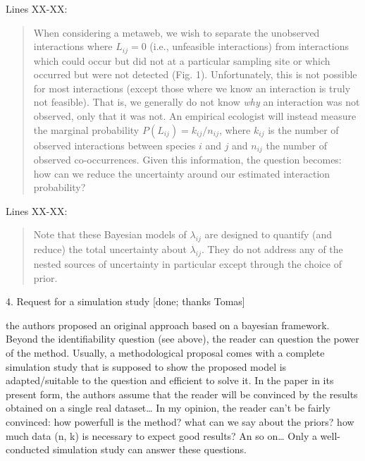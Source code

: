 \documentclass[12pt]{letter}
\newenvironment{refquote}{\bigskip \begin{it}}{\end{it}\smallskip}
\begin{document}
		Lines XX-XX:


		\begin{quotation}
			When considering a metaweb, we wish to separate the unobserved interactions where $L_{ij} = 0$ (i.e., unfeasible interactions) from interactions which could occur but did not at a particular sampling site or which occurred but were not detected (Fig. 1). Unfortunately, this is not possible for most interactions (except those where we know an interaction is truly not feasible). That is, we generally do not know \emph{why} an interaction was not observed, only that it was not. An empirical ecologist will instead measure the marginal probability $P(L_{ij}) = k_{ij}/n_{ij}$, where $k_{ij}$ is the number of observed interactions between species $i$ and $j$ and $n_{ij}$ the number of observed co-occurrences. Given this information, the question becomes: how can we reduce the uncertainty around our estimated interaction probability?
		\end{quotation}


		Lines XX-XX:


		\begin{quotation}
			Note that these Bayesian models of $\lambda_{ij}$ are designed to quantify (and reduce) the total uncertainty about $\lambda_{ij}$. They do not address any of the nested sources of uncertainty in particular except through the choice of prior.
		\end{quotation}


	4. Request for a simulation study [done; thanks Tomas]


		\begin{refquote}
			the authors proposed an original approach based on a bayesian framework. Beyond the identifiability question (see above), the reader can question the power of the method. Usually, a methodological proposal comes with a complete simulation study that is supposed to show  the proposed model is adapted/suitable to the question and efficient to solve it. In the paper in its present form, the authors assume that the reader will be convinced by the results obtained on a single real dataset… In my opinion, the reader can’t be fairly convinced: how powerfull is the method? what can we say about the priors? how much data (n, k) is necessary to expect good results? An so on… Only a well-conducted simulation study can answer these questions.
		\end{refquote}
\end{document}
